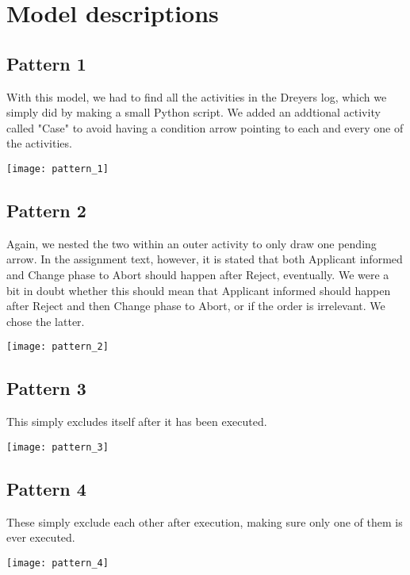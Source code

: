 \section*{Model descriptions}

\subsection*{Pattern 1}
With this model, we had to find all the activities in the Dreyers log, which we simply did by
making a small Python script. We added an addtional activity called "Case" to avoid having
a condition arrow pointing to each and every one of the activities.
\begin{center}
    \texttt{[image: pattern\_1]}
\end{center}	

\newpage
\subsection*{Pattern 2}
Again, we nested the two within an outer activity to only draw one pending arrow.
In the assignment text, however, it is stated that both Applicant informed and Change phase to
Abort should happen after Reject, eventually. We were a bit in doubt whether this should mean that
Applicant informed should happen after Reject and then Change phase to Abort, or if the order is
irrelevant. We chose the latter.
\begin{center}
    \texttt{[image: pattern\_2]}
\end{center}	

\subsection*{Pattern 3}
This simply excludes itself after it has been executed.
\begin{center}
    \texttt{[image: pattern\_3]}
\end{center}	

\subsection*{Pattern 4}
These simply exclude each other after execution, making sure only one of them is ever executed.
\begin{center}
    \texttt{[image: pattern\_4]}
\end{center}	

